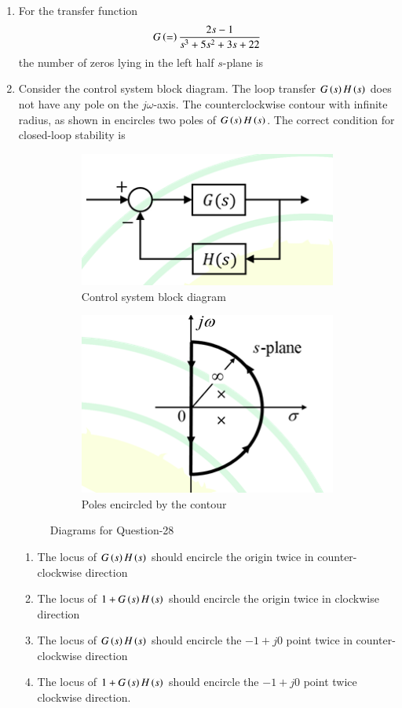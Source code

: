\documentclass[journal,12pt,onecolumn]{IEEEtran}
\theoremstyle{remark}
\begin{document}
\begin{enumerate}
\item For the transfer function 
$$G\left(=\right)\frac{2s-1}{s^3+5s^2+3s+22}$$
the number of zeros lying in the left half $s$-plane is \par\hfill{}
\begin{enumerate}
\end{enumerate}


\item Consider the control system block diagram. The loop transfer $G\left(s\right)H\left(s\right)$ does not have any pole on the $j\omega$-axis. The counterclockwise contour with infinite radius, as shown in  encircles two poles of $G\left(s\right)H\left(s\right)$. The correct condition for closed-loop stability is \par\hfill{}
\begin{figure}[H]
\centering
\begin{subfigure}{.5\columnwidth}
  \centering
  \includegraphics[width=.4\columnwidth]{Figs/Q-28(a).png}
  \caption{Control system block diagram}
  \label{28(a)}
\end{subfigure}
\begin{subfigure}{.5\columnwidth}
  \centering
  \includegraphics[width=.4\columnwidth]{Figs/Q-28(b).png}
  \caption{Poles encircled by the contour}
  \label{28(b)}
\end{subfigure}
\caption{Diagrams for Question-28}
\label{fig:test}
\end{figure}
\begin{enumerate}
\item The locus of $G\left(s\right)H\left(s\right)$ should encircle the origin twice in counter-clockwise direction
\item The locus of $1+G\left(s\right)H\left(s\right)$ should encircle the origin twice in clockwise direction
\item The locus of $G\left(s\right)H\left(s\right)$ should encircle the $-1+j0$ point twice in counter-clockwise direction
\item The locus of $1+G\left(s\right)H\left(s\right)$ should encircle the $-1+j0$ point twice clockwise direction. 
\end{enumerate}



\end{enumerate}
\end{document}

